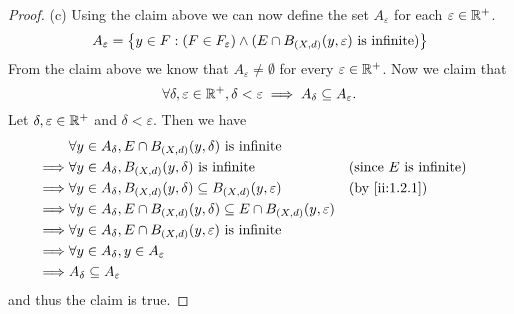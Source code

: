 \begin{proof}{(c)}
  Using the claim above we can now define the set \(A_\varepsilon\) for each \(\varepsilon \in \mathbb{R}^+\).
  \[
    A_\varepsilon = \left\lbrace y \in F : (F \in F_\varepsilon) \land (E \cap B_{(X, d)}(y, \varepsilon) \text{ is infinite})\right\rbrace
  \]
  From the claim above we know that \(A_\varepsilon \neq \emptyset\) for every \(\varepsilon \in \mathbb{R}^+\).
  Now we claim that
  \[
    \forall \delta, \varepsilon \in \mathbb{R}^+, \delta < \varepsilon \implies A_\delta \subseteq A_\varepsilon.
  \]
  Let \(\delta, \varepsilon \in \mathbb{R}^+\) and \(\delta < \varepsilon\).
  Then we have
  \begin{align*}
             & \forall y \in A_\delta, E \cap B_{(X, d)}(y, \delta) \text{ is infinite}                                                               \\
    \implies & \forall y \in A_\delta, B_{(X, d)}(y, \delta) \text{ is infinite}                                &  & \text{(since \(E\) is infinite)} \\
    \implies & \forall y \in A_\delta, B_{(X, d)}(y, \delta) \subseteq B_{(X, d)}(y, \varepsilon)               &  & \by{ii:1.2.1}                    \\
    \implies & \forall y \in A_\delta, E \cap B_{(X, d)}(y, \delta) \subseteq E \cap B_{(X, d)}(y, \varepsilon)                                       \\
    \implies & \forall y \in A_\delta, E \cap B_{(X, d)}(y, \varepsilon) \text{ is infinite}                                                          \\
    \implies & \forall y \in A_\delta, y \in A_\varepsilon                                                                                            \\
    \implies & A_\delta \subseteq A_\varepsilon
  \end{align*}
  and thus the claim is true.


\end{proof}
